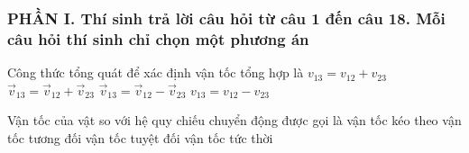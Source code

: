 \subsubsection*{PHẦN I. Thí sinh trả lời câu hỏi từ câu 1 đến câu 18. Mỗi câu hỏi thí sinh chỉ chọn một phương án}
\setcounter{ex}{0}
\begin{ex}%
Công thức tổng quát để xác định vận tốc tổng hợp là
\choice
{$v_{13}=v_{12}+v_{23}$}
{\True $\overrightarrow{v}_{13}=\overrightarrow{v}_{12}+\overrightarrow{v}_{23}$}
{$\overrightarrow{v}_{13}=\overrightarrow{v}_{12}-\overrightarrow{v}_{23}$}
{$v_{13}=v_{12}-v_{23}$}
\loigiai{}
\end{ex}
\begin{ex}%
Vận tốc của vật so với hệ quy chiếu chuyển động được gọi là
\choice
{vận tốc kéo theo}
{\True vận tốc tương đối}
{vận tốc tuyệt đối}
{vận tốc tức thời}	
\loigiai{}
 \end{ex}

